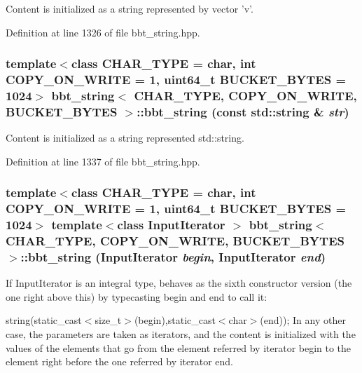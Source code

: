 Content is initialized as a string represented by vector 'v'. 

Definition at line 1326 of file bbt\_\-string.hpp.\hypertarget{classbbt__string_496d220047c4dab83664794ea1b754d1}{
\subsubsection[{bbt\_\-string}]{\setlength{\rightskip}{0pt plus 5cm}template$<$class CHAR\_\-TYPE  = char, int COPY\_\-ON\_\-WRITE = 1, uint64\_\-t BUCKET\_\-BYTES = 1024$>$ {\bf bbt\_\-string}$<$ CHAR\_\-TYPE, COPY\_\-ON\_\-WRITE, BUCKET\_\-BYTES $>$::{\bf bbt\_\-string} (const std::string \& {\em str})}}
\label{classbbt__string_496d220047c4dab83664794ea1b754d1}


Content is initialized as a string represented std::string. 

Definition at line 1337 of file bbt\_\-string.hpp.\hypertarget{classbbt__string_2e84206283397353a456342f891ef460}{
\subsubsection[{bbt\_\-string}]{\setlength{\rightskip}{0pt plus 5cm}template$<$class CHAR\_\-TYPE  = char, int COPY\_\-ON\_\-WRITE = 1, uint64\_\-t BUCKET\_\-BYTES = 1024$>$ template$<$class InputIterator $>$ {\bf bbt\_\-string}$<$ CHAR\_\-TYPE, COPY\_\-ON\_\-WRITE, BUCKET\_\-BYTES $>$::{\bf bbt\_\-string} (InputIterator {\em begin}, \/  InputIterator {\em end})}}
\label{classbbt__string_2e84206283397353a456342f891ef460}


If InputIterator is an integral type, behaves as the sixth constructor version (the one right above this) by typecasting begin and end to call it:

string(static\_\-cast$<$size\_\-t$>$(begin),static\_\-cast$<$char$>$(end)); In any other case, the parameters are taken as iterators, and the content is initialized with the values of the elements that go from the element referred by iterator begin to the element right before the one referred by iterator end. 

